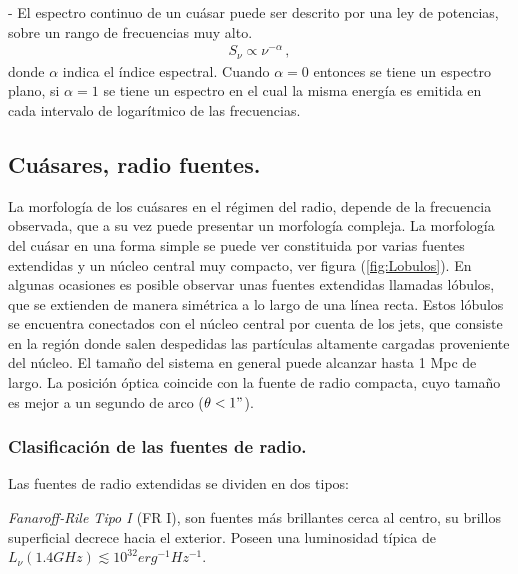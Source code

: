 - El espectro continuo de un cuásar puede ser descrito por una ley de potencias, sobre un rango de frecuencias muy alto.
%
\begin{align}
S_{\nu} \propto \nu^{-\alpha} \,,
\end{align}
%
 donde $\alpha$ indica el índice espectral. Cuando $\alpha=0$ entonces se tiene un espectro plano, si $\alpha=1$ se tiene un espectro en el cual la misma energía es emitida en cada intervalo de logarítmico de las frecuencias. 


	\subsection{Cuásares, radio fuentes.}
	\label{subsec:}

La morfología de los cuásares en el régimen del radio, depende de la frecuencia observada, que a su vez puede presentar un morfología compleja. La morfología del cuásar en una forma simple se puede ver  constituida por varias fuentes extendidas y un núcleo central muy compacto, ver figura (\ref{fig:Lobulos}). En algunas ocasiones es posible observar unas fuentes extendidas llamadas lóbulos, que se extienden de manera simétrica a lo largo de una línea recta. Estos lóbulos se encuentra conectados con el núcleo central por cuenta de los jets, que consiste en la región donde salen despedidas las partículas altamente cargadas proveniente del núcleo. El tamaño del sistema en general puede alcanzar hasta 1 Mpc de largo. La posición óptica coincide con la fuente de radio compacta, cuyo tamaño es mejor a un segundo de arco ($\theta < 1"$).

	\subsubsection{Clasificación de las fuentes de radio.}
	\label{subsubsec: clasification_source_radio}

Las fuentes de radio extendidas se dividen en dos tipos:

{\it{Fanaroff-Rile Tipo I }} (FR I), son fuentes más brillantes cerca al centro, su brillos superficial decrece hacia el exterior. Poseen una luminosidad típica de $L_{\nu}(1.4GHz)\lesssim 10^{32} erg^{-1} Hz^{-1}$.


